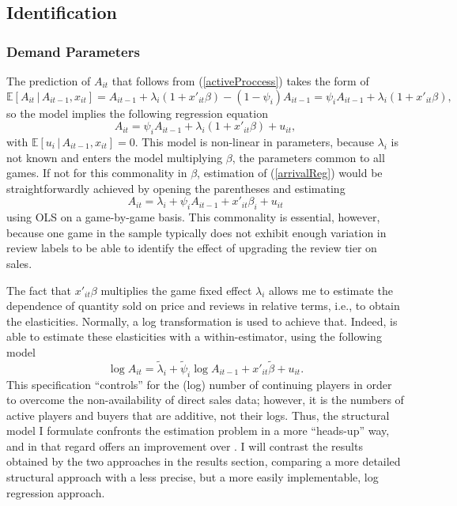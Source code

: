 \documentclass[
  12pt,
  pagebackref]{article}
\begin{document}
\hypertarget{identification}{%
\subsection{Identification}\label{identification}}

\hypertarget{demand-parameters}{%
\subsubsection{Demand Parameters}\label{demand-parameters}}

The prediction of \(A_{it}\) that follows from (\ref{activeProccess})
takes the form of \begin{equation}
\mathbb{E}\left[A_{it}\,|\,A_{it-1}, x_{it} \right] = A_{it-1} + \lambda_i(1+x'_{it}\beta) - (1-\psi_i)A_{it-1} = \psi_i A_{it-1} + \lambda_i(1+x'_{it}\beta),
\end{equation} so the model implies the following regression equation
\begin{equation}\label{arrivalReg}
 A_{it} = \psi_i A_{it-1} + \lambda_i(1+x'_{it}\beta) + u_{it},
\end{equation} with
\(\mathbb{E}\left[u_i\,|\,A_{it-1}, x_{it} \right] = 0\). This model is
non-linear in parameters, because \(\lambda_i\) is not known and enters
the model multiplying \(\beta\), the parameters common to all games. If
not for this commonality in \(\beta\), estimation of (\ref{arrivalReg})
would be straightforwardly achieved by opening the parentheses and
estimating \begin{equation}\label{arrivalRegInd}
A_{it} = \lambda_i + \psi_i A_{it-1} + x'_{it}\beta_i + u_{it}
\end{equation} using OLS on a game-by-game basis. This commonality is
essential, however, because one game in the sample typically does not
exhibit enough variation in review labels to be able to identify the
effect of upgrading the review tier on sales.

The fact that \(x'_{it}\beta\) multiplies the game fixed effect
\(\lambda_i\) allows me to estimate the dependence of quantity sold on
price and reviews in relative terms, i.e., to obtain the elasticities.
Normally, a log transformation is used to achieve that. Indeed,
\citet{SorokinStevens20} is able to estimate these elasticities with a
within-estimator, using the following model
\begin{equation}\label{logReg}
\log A_{it} = \tilde\lambda_i + \tilde\psi_i \log A_{it-1} + x'_{it}\tilde \beta + u_{it}.
\end{equation} This specification ``controls'' for the (log) number of
continuing players in order to overcome the non-availability of direct
sales data; however, it is the numbers of active players and buyers that
are additive, not their logs. Thus, the structural model I formulate
confronts the estimation problem in a more ``heads-up'' way, and in that
regard offers an improvement over \citet{SorokinStevens20}. I will
contrast the results obtained by the two approaches in the results
section, comparing a more detailed structural approach with a less
precise, but a more easily implementable, log regression approach.
\end{document}
